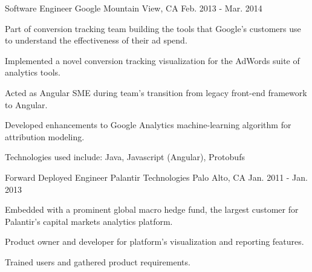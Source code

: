 \begin{cventries}
  \cventry
    {Software Engineer} %
    {Google} %
    {Mountain View, CA} %
    {Feb. 2013 - Mar. 2014} %
    {
      \begin{cvitems} %
        \item {Part of conversion tracking team building the tools that Google's customers use to understand the effectiveness of their ad spend.}
        \item {Implemented a novel conversion tracking visualization for the AdWords suite of analytics tools.}
        \item {Acted as Angular SME during team’s transition from legacy front-end framework to Angular.}
        \item {Developed enhancements to Google Analytics machine-learning algorithm for attribution modeling.}
        \item {Technologies used include: Java, Javascript (Angular), Protobufs}
      \end{cvitems}
    }

  \cventry
    {Forward Deployed Engineer} %
    {Palantir Technologies} %
    {Palo Alto, CA} %
    {Jan. 2011 - Jan. 2013} %
    {
      \begin{cvitems} %
        \item {Embedded with a prominent global macro hedge fund, the largest customer for Palantir's capital markets analytics platform.}
        \item {Product owner and developer for platform's visualization and reporting features.}
        \item {Trained users and gathered product requirements.}
      \end{cvitems}
    }

\end{cventries}
